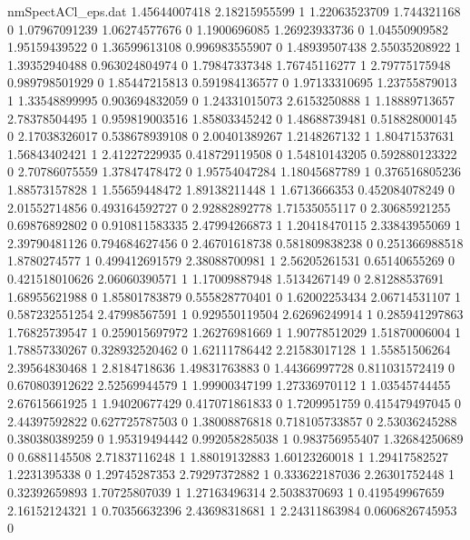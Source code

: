 \begin{filecontents}{nmSpectACl_eps.dat}
1.45644007418 2.18215955599 1
1.22063523709 1.744321168 0
1.07967091239 1.06274577676 0
1.1900696085 1.26923933736 0
1.04550909582 1.95159439522 0
1.36599613108 0.996983555907 0
1.48939507438 2.55035208922 1
1.39352940488 0.963024804974 0
1.79847337348 1.76745116277 1
2.79775175948 0.989798501929 0
1.85447215813 0.591984136577 0
1.97133310695 1.23755879013 1
1.33548899995 0.903694832059 0
1.24331015073 2.6153250888 1
1.18889713657 2.78378504495 1
0.959819003516 1.85803345242 0
1.48688739481 0.518828000145 0
2.17038326017 0.538678939108 0
2.00401389267 1.2148267132 1
1.80471537631 1.56843402421 1
2.41227229935 0.418729119508 0
1.54810143205 0.592880123322 0
2.70786075559 1.37847478472 0
1.95754047284 1.18045687789 1
0.376516805236 1.88573157828 1
1.55659448472 1.89138211448 1
1.6713666353 0.452084078249 0
2.01552714856 0.493164592727 0
2.92882892778 1.71535055117 0
2.30685921255 0.69876892802 0
0.910811583335 2.47994266873 1
1.20418470115 2.33843955069 1
2.39790481126 0.794684627456 0
2.46701618738 0.581809838238 0
0.251366988518 1.8780274577 1
0.499412691579 2.38088700981 1
2.56205261531 0.65140655269 0
0.421518010626 2.06060390571 1
1.17009887948 1.5134267149 0
2.81288537691 1.68955621988 0
1.85801783879 0.555828770401 0
1.62002253434 2.06714531107 1
0.587232551254 2.47998567591 1
0.929550119504 2.62696249914 1
0.285941297863 1.76825739547 1
0.259015697972 1.26276981669 1
1.90778512029 1.51870006004 1
1.78857330267 0.328932520462 0
1.62111786442 2.21583017128 1
1.55851506264 2.39564830468 1
2.8184718636 1.49831763883 0
1.44366997728 0.811031572419 0
0.670803912622 2.52569944579 1
1.99900347199 1.27336970112 1
1.03545744455 2.67615661925 1
1.94020677429 0.417071861833 0
1.7209951759 0.415479497045 0
2.44397592822 0.627725787503 0
1.38008876818 0.718105733857 0
2.53036245288 0.380380389259 0
1.95319494442 0.992058285038 1
0.983756955407 1.32684250689 0
0.6881145508 2.71837116248 1
1.88019132883 1.60123260018 1
1.29417582527 1.2231395338 0
1.29745287353 2.79297372882 1
0.333622187036 2.26301752448 1
0.32392659893 1.70725807039 1
1.27163496314 2.5038370693 1
0.419549967659 2.16152124321 1
0.70356632396 2.43698318681 1
2.24311863984 0.0606826745953 0
\end{filecontents}
